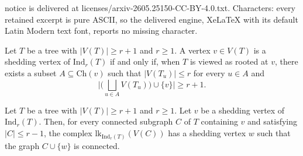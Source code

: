 \documentclass[10pt,a4paper]{amsart}
\def\Ind{\mathrm{Ind}}
\def\lk{\mathrm{lk}}
\begin{document}
notice is delivered at licenses/arxiv-2605.25150-CC-BY-4.0.txt. Characters: every retained excerpt is pure ASCII, so the delivered engine, XeLaTeX with its default Latin Modern text font, reports no missing character.
\begin{lemma}\label{lem: all shedding vertices}
Let $T$ be a tree with $|V(T)| \ge r+1$ and $r \ge 1$. A vertex $v \in V(T)$ is a shedding vertex of $\Ind_r(T)$ if and only if, when $T$ is viewed as rooted at $v$, there exists a subset $A \subseteq \mathrm{Ch}(v)$ such that $|V(T_u)| \le r$ for every $u \in A$ and 
\[
\Big|\Big(\bigsqcup_{u \in A} V(T_u)\Big) \cup \{v\}\Big| \ge r+1.
\]
\end{lemma}

\begin{lemma}\label{lem: existence of shedding vertex in link}
Let $T$ be a tree with $|V(T)| \ge r+1$ and $r \ge 1$. Let $v$ be a shedding vertex of $\Ind_r(T)$. Then, for every connected subgraph $C$ of $T$ containing $v$ and satisfying $|C| \le r-1$, the complex $\lk_{\Ind_r(T)}(V(C))$ has a shedding vertex $w$ such that the graph $C\cup\{w\}$ is connected.
\end{lemma}
\end{document}
